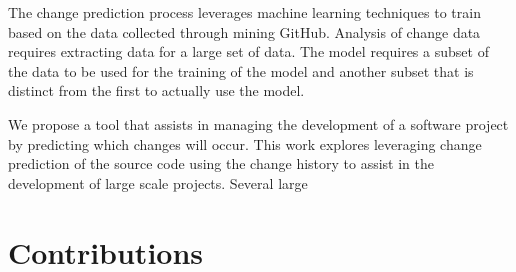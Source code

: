 

The change prediction process leverages machine learning techniques to train based on the data collected through mining GitHub. Analysis of change data requires extracting data for a large set of data. The model requires a subset of the data to be used for the training of the model and another subset that is distinct from the first to actually use the model.



We propose a tool that assists in managing the development of a software project by predicting which changes will occur. This work explores leveraging change prediction of the source code using the change history to assist in the development of large scale projects. Several large \

\section{Contributions}


